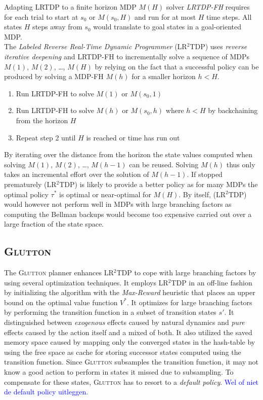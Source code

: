 \documentclass[runningheads,a4paper]{llncs}
\newcommand\todo[1]{\textcolor{blue}{#1}}
\begin{document}
Adapting LRTDP to a finite horizon MDP $M(H)$ solver \emph{LRTDP-FH} requires for each trial to start at $s_0$ or $M(s_0, H)$ and run for at most $H$ time steps. All states $H$ steps away from $s_0$ would translate to goal states in a goal-oriented MDP. \\

The \emph{Labeled Reverse Real-Time Dynamic Programmer} (LR$^2$TDP) uses \emph{reverse iterative deepening} and LRTDP-FH to incrementally solve a sequence of MDPs $M(1)$, $M(2)$, \ldots , $M(H)$ by relying on the fact that a successful policy can be produced by solving a MDP-FH $M(h)$ for a smaller horizon $h < H$.

\begin{enumerate}
	\item Run LRTDP-FH to solve $M(1)$ or $M(s_0, 1)$
	\item Run LRTDP-FH to solve $M(h)$ or $M(s_0, h)$ where $h < H$ by backchaining from the horizon $H$
	\item Repeat step 2 until $H$ is reached or time has run out
\end{enumerate}
By iterating over the distance from the horizon the state values computed when solving $M(1)$, $M(2)$, \ldots, $M(h-1)$ can be reused. Solving $M(h)$ thus only takes an incremental effort over the solution of $M(h-1)$. If stopped prematurely  (LR$^2$TDP) is likely to provide a better policy as for many MDPs the optimal policy $\tau^*$ is optimal or near-optimal for $M(H)$. By itself,  (LR$^2$TDP) would however not perform well in MDPs with large branching factors as computing the Bellman backups would become too expensive carried out over a large fraction of the state space.

\subsection{\textsc{Glutton}}
The \textsc{Glutton} planner enhances LR$^2$TDP to cope with large branching factors by using several optimization techniques. It employs LR$^2$TDP in an off-line fashion by initializing the algorithm with the \emph{Max-Reward} heuristic that places an upper bound on the optimal value function $V^*$. It optimizes for large branching factors by performing the transition function in a subset of transition states $s'$. It distinguished between \emph{exogenous} effects caused by natural dynamics and \emph{pure} effects caused by the action itself and a mixed of both. It also utilized the saved memory space caused by mapping only the converged states in the hash-table by using the free space as cache for storing successor states computed using the transition function.
Since \textsc{Glutton} subsamples the transition function, it may not know a good action to perform in states it missed due to subsampling. To compensate for these states, \textsc{Glutton} has to resort to a \emph{default policy}. \todo{Wel of niet de default policy uitleggen}.
\end{document}
